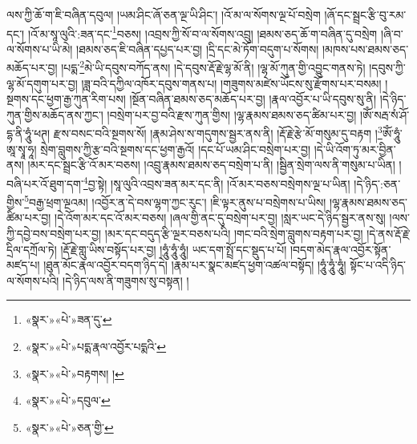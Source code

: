 ལས་ཀྱི་ཆོ་ག་ཇི་བཞིན་དབུལ། །ཡམ་ཤིང་ཞོ་ཅན་ལྔ་ཡི་ཤིང་། །འོ་མ་ལ་སོགས་ལྔ་པོ་བསྲེག །ཞོ་དང་སྦྲང་རྩི་བུ་རམ་དང་། །འོ་མ་སཱ་ལུའི་:ཟན་དང་\footnote{«སྣར་»«པེ་»ཟན་དུ་}བཅས། །འབྲས་ཀྱི་སོ་བ་ལ་སོགས་འབྲུ། །ཐམས་ཅད་ཆོ་ག་བཞིན་དུ་བསྲེག །ཞི་བ་ལ་སོགས་པ་ཡི་མེ། །ཐམས་ཅད་ཇི་བཞིན་དཔྱད་པར་བྱ། །དྲི་དང་མེ་ཏོག་བདུག་པ་སོགས། །མཁས་པས་ཐམས་ཅད་མཆོད་པར་བྱ། །པདྨ་\footnote{«སྣར་»«པེ་»པདྨ་རྣལ་འབྱོར་པདྨའི་}མེ་ཡི་དབུས་བཀོད་ནས། །དེ་དབུས་རྡོ་རྗེ་ལྷ་མོ་ནི། །ལྷ་མོ་ཀུན་གྱི་འབྱུང་གནས་ཏེ། །དབུས་ཀྱི་ལྷ་མོ་དགུག་པར་བྱ། །ཟླ་བའི་དཀྱིལ་འཁོར་དབུས་གནས་པ། །གཟུགས་མཛེས་ཡོངས་སུ་རྫོགས་པར་བསམ། །སྔགས་དང་ཕྱག་རྒྱ་ཀུན་རིག་པས། །སྔོན་བཞིན་ཐམས་ཅད་མཆོད་པར་བྱ། །རྣལ་འབྱོར་པ་ཡི་དབུས་སུ་ནི། །དེ་ཉིད་ཀུན་གྱིས་མཆོད་ནས་ཀྱང་། །བསྲེག་པར་བྱ་བའི་རྫས་ཀུན་གྱིས། །ལྷ་རྣམས་ཐམས་ཅད་ཚིམ་པར་བྱ། །ཨོཾ་སརྦ་སཾ་ཤོ་དྷ་ནི་ཧཱུཾ་ཕཊ། རྫས་བསང་བའི་སྔགས་སོ། །རྣམ་ཤེས་ས་གདུགས་སྦྱར་ནས་ནི། །རྡོ་རྗེ་རྩེ་མོ་གསུམ་དུ་བརྟག །\footnote{«སྣར་»«པེ་»བརྟགས། །}ཨོཾ་ཧཱུཾ་ཨཱ་སྭཱ་ཧཱ། སྲེག་བླུགས་ཀྱི་རྩ་བའི་སྔགས་དང་ཕྱག་རྒྱའོ། །དང་པོ་ཡམ་ཤིང་བསྲེག་པར་བྱ། །དེ་ཡི་འོག་ཏུ་མར་བྱིན་ནས། །མར་དང་སྦྲང་རྩི་འོ་མར་བཅས། །འབྲུ་རྣམས་ཐམས་ཅད་བསྲེག་པ་ནི། །སྦྱིན་སྲེག་ལས་ནི་གསུམ་པ་ཡིན། །བཞི་པར་འོ་ཐུག་དག་\footnote{«སྣར་»«པེ་»དབུལ་}བྱ་སྟེ། །སཱ་ལུའི་འབྲས་ཟན་མར་དང་ནི། །འོ་མར་བཅས་བསྲེགས་ལྔ་པ་ཡིན། །དེ་ཉིད་:ཅན་གྱིས་\footnote{«སྣར་»«པེ་»ཅན་གྱི་}བརྒྱ་ཕྲག་ལྔའམ། །འབྱོར་ན་དེ་བས་ལྷག་ཀྱང་རུང་། །ཇི་ལྟར་ནུས་པ་བསྲེགས་པ་ཡིས། །ལྷ་རྣམས་ཐམས་ཅད་ཚིམ་པར་བྱ། །དེ་འོག་མར་དང་འོ་མར་བཅས། །ཞལ་གྱི་ནང་དུ་བསྲེག་པར་བྱ། །སླར་ཡང་དེ་ཉིད་སྦྱར་ནས་སུ། །ལས་ཀྱི་དབྱེ་བས་བསྲེག་པར་བྱ། །མར་དང་བདུད་རྩི་ལྔར་བཅས་པའི། །གང་བའི་སྲེག་བླུགས་བརྟག་པར་བྱ། །དེ་ནས་རྡོ་རྗེ་དྲིལ་དཀྲོལ་ཏེ། །རྡོ་རྗེ་གླུ་ཡིས་བསྟོད་པར་བྱ། །ཧཱུཾ་ཧཱུཾ་ཧཱུཾ། ཡང་དག་སྤྲོ་དང་སྡུད་པ་པོ། །བདག་མེད་རྣལ་འབྱོར་སྟོན་མཛད་པ། །ཐུན་མོང་རྣལ་འབྱོར་བདག་ཉིད་དེ། །རྣམ་པར་སྣང་མཛད་ཕྱག་འཚལ་བསྟོད། །ཧཱུཾ་ཧཱུཾ་ཧཱུཾ། སྟོང་པ་འདི་ཉིད་ལ་སོགས་པའི། །དེ་ཉིད་ལས་ནི་གཟུགས་སུ་བསྟན། །
